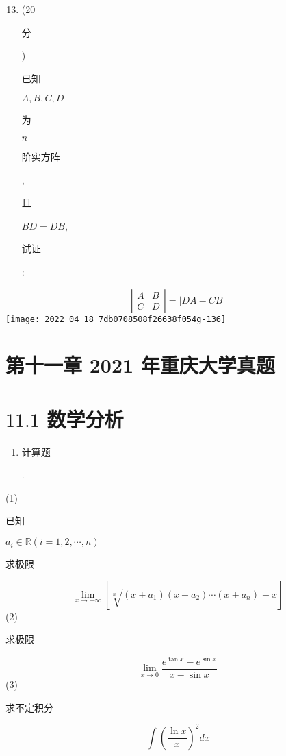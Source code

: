 \documentclass[10pt]{article}
\begin{document}
\begin{enumerate}
  \setcounter{enumi}{12}
  \item (20 \begin{CJK}{UTF8}{mj}分\end{CJK}) \begin{CJK}{UTF8}{mj}已知\end{CJK} $A, B, C, D$ \begin{CJK}{UTF8}{mj}为\end{CJK} $n$ \begin{CJK}{UTF8}{mj}阶实方阵\end{CJK}, \begin{CJK}{UTF8}{mj}且\end{CJK} $B D=D B$, \begin{CJK}{UTF8}{mj}试证\end{CJK}:
\end{enumerate}
$$
\left|\begin{array}{ll}
A & B \\
C & D
\end{array}\right|=|D A-C B|
$$
\texttt{[image: 2022\_04\_18\_7db0708508f26638f054g-136]}

\section{第十一章 2021 年重庆大学真题}
\section{$11.1$ 数学分析}
\begin{enumerate}
  \item \begin{CJK}{UTF8}{mj}计算题\end{CJK}.
\end{enumerate}
(1) \begin{CJK}{UTF8}{mj}已知\end{CJK} $a_{i} \in \mathbb{R}(i=1,2, \cdots, n)$ \begin{CJK}{UTF8}{mj}求极限\end{CJK}
$$
\lim _{x \rightarrow+\infty}\left[\sqrt[n]{\left(x+a_{1}\right)\left(x+a_{2}\right) \cdots\left(x+a_{n}\right)}-x\right]
$$
(2) \begin{CJK}{UTF8}{mj}求极限\end{CJK}
$$
\lim _{x \rightarrow 0} \frac{e^{\tan x}-e^{\sin x}}{x-\sin x}
$$
(3) \begin{CJK}{UTF8}{mj}求不定积分\end{CJK}
$$
\int\left(\frac{\ln x}{x}\right)^{2} d x
$$
\end{document}
